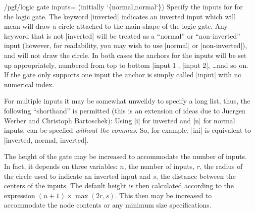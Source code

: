 \begin{key}{/pgf/logic gate inputs= (initially \char`\{normal,normal\char`\})}
  Specify the inputs for for the logic gate. The keyword |inverted|
  indicates an inverted input which will mean \pgfname{} will draw a
  circle attached to the main shape of the logic gate. Any keyword
  that is not |inverted| will be treated as a ``normal'' or 
  ``non-inverted'' input (however, for readability, you may wish to 
  use |normal| or |non-inverted|), and \pgfname{} will not draw the 
  circle.  
  In both cases the anchors for the inputs will be set 
  up appropriately, numbered from top to bottom |input 1|, |input 2|,
  \ldots and so on. If the gate only supports one input the anchor
  is simply called |input| with no numerical index.
  
\begin{codeexample}[]
\end{codeexample} 
  
  For multiple inputs it may be somewhat unweildy to specify a long
  list, thus, the following ``shorthand'' is permitted (this is an  
  extension of ideas due to Juergen Werber and Christoph Bartoschek):
  Using |i| for inverted and |n| for normal inputs, 
  can be specfied \emph{without the commas}. So, for example,
  |ini| is equivalent to |inverted, normal, inverted|.
  
\begin{codeexample}[]
\end{codeexample} 
 
\end{key}


The height of the gate may be increased to accommodate the number 
of inputs. In fact, it depends on three variables:
$n$, the number of inputs, $r$, the radius of the circle used
to indicate an inverted input and $s$, the distance between
the centers of the inputs.
The default height is then calculated according to the expression 
$(n+1)\times\max(2r,s)$. This then may
be increased to accommodate the node contents or any
minimum size specifications.

